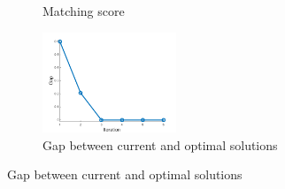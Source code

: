 \documentclass[hyperref={pdfpagelabels=false}]{beamer}
\begin{document}
\begin{frame}[allowframebreaks]
\begin{figure}
\begin{center}
\begin{subfigure}[t]{0.32\textwidth}
			\caption{\scriptsize Matching score\hspace{5pt}}
		\end{subfigure}
		\begin{subfigure}[t]{0.32\textwidth}
			\includegraphics[width=4cm]{"fig/evaluation/ImageTrafo/sIterations/gap"}
			\caption{\scriptsize Gap between current and optimal solutions}
		\end{subfigure} 	
	\end{center}		
\end{figure}
\end{frame}
\end{document}
